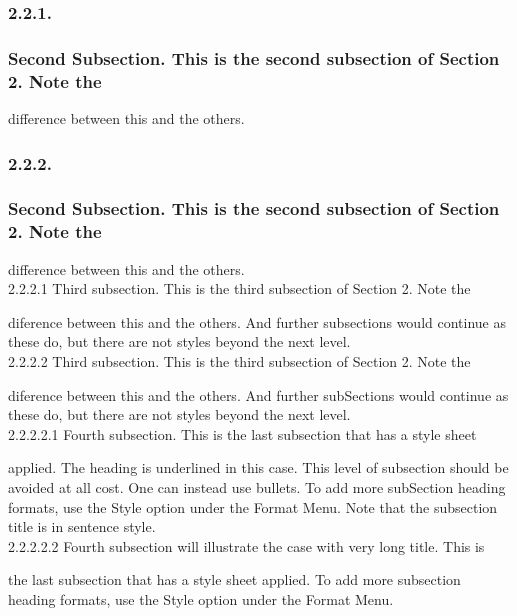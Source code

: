 \documentclass{article}
\newcommand{\tab}{\hspace{5mm}}
\begin{document}
\subsubsection*{2.2.1.\tab }


\subsubsection*{
Second Subsection. This is the second subsection of Section 2. 
Note the}

difference between this and the others.\\


\subsubsection*{2.2.2.\tab }


\subsubsection*{
Second Subsection. This is the second subsection of Section 2. 
Note the}

difference between this and the others.\\
2.2.2.1\tab 
Third subsection. This is the third subsection of Section 2. 
Note the


diference between this and the others. And further subsections 
would continue as these do, but there are not styles beyond the 
next level.\\
2.2.2.2\tab 
Third subsection. This is the third subsection of Section 2. 
Note the


diference between this and the others. And further subSections 
would continue as these do, but there are not styles beyond the 
next level.\\
2.2.2.2.1\tab 
Fourth subsection. This is the last subsection that has a style 
sheet 


applied. The heading is underlined in this case. This level of 
subsection should be avoided at all cost. One can instead use 
bullets. To add more subSection heading formats, use the Style 
option under the Format Menu. Note that the subsection title 
is in sentence style.\\
2.2.2.2.2\tab 
Fourth subsection will illustrate the case with very long title. 
This is 


the last subsection that has a style sheet applied. To add more 
subsection heading formats, use the Style option under the Format 
Menu.
\end{document}
